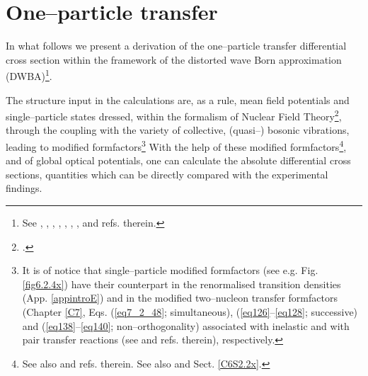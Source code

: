 \chapter{One--particle transfer}\label{C6}
In what follows we present a derivation of the one--particle transfer differential cross section within the framework of the distorted wave Born approximation (DWBA)\footnote{See \cite{Tobocman:61}, \cite{Austern:63}, \cite{Jackson:70} \citet{Satchler:80,Broglia:04a}, \cite{Satchler:83}, \cite{Austern:70}, \cite{Glendenning:04}, \cite{Thompson:09},  and refs. therein.}.




 The structure input in the calculations are, as a rule, mean field potentials and single--particle states dressed, within the formalism of Nuclear Field Theory\footnote{ \cite{Bes:74,Bes:75,Bohr:75,Bes:76c,Bes:76a,Bes:76b,Mottelson:76,Broglia:76,Bes:77,Bortignon:77,Bes:90}.}, through the coupling with the variety of collective, (quasi--) bosonic vibrations, leading to modified formfactors\footnote{It is of notice that single--particle modified formfactors (see e.g. Fig. \ref{fig6.2.4x}) have their counterpart in the renormalised transition densities (App. \ref{appintroE})  and in the modified two--nucleon transfer formfactors (Chapter \ref{C7}, Eqs. (\ref{eq7_2_48}; simultaneous), (\ref{eq126}--\ref{eq128}; successive) and (\ref{eq138}--\ref{eq140}; non--orthogonality) associated with inelastic and with pair transfer  reactions  (see \cite{Broglia:73,Potel:13} and refs. therein), respectively.} With the help of these modified formfactors\footnote{See also \cite{Vaagen:79,Bang:80,Hamamoto:70} and refs. therein. See also \cite{Barranco:17} and Sect. \ref{C6S2.2x}.}, and of global optical potentials, one can calculate the absolute differential cross sections, quantities which can  be directly compared with the experimental findings.
	
